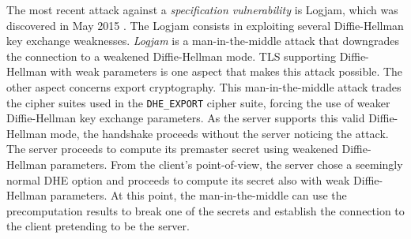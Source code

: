 \documentclass{sig-alternate-05-2015}
\newcommand{\suite}[1]{\texttt{{\footnotesize #1}}}
\begin{document}
The most recent attack against a \emph{specification vulnerability} is Logjam, which was discovered in May 2015 \cite{Adrian2015}. The Logjam  consists in exploiting several Diffie-Hellman key exchange weaknesses.
\textit{Logjam} is a man-in-the-middle attack that downgrades the connection to a weakened Diffie-Hellman mode. TLS supporting Diffie-Hellman with weak parameters is one aspect that makes this attack possible. The other aspect concerns  export cryptography. 
%
%
This man-in-the-middle attack trades the cipher suites used in the \suite{DHE\_EXPORT} cipher suite, forcing the use of weaker Diffie-Hellman key exchange parameters. As the server supports this valid Diffie-Hellman mode, the handshake proceeds without the server noticing the attack. The server proceeds to compute its premaster secret using weakened Diffie-Hellman parameters. From the client's point-of-view, the server chose a seemingly normal DHE option and proceeds to compute its secret also with weak Diffie-Hellman parameters. At this point, the man-in-the-middle can use the precomputation results to break one of the secrets and establish the connection to the client pretending to be the server. 

\end{document}
